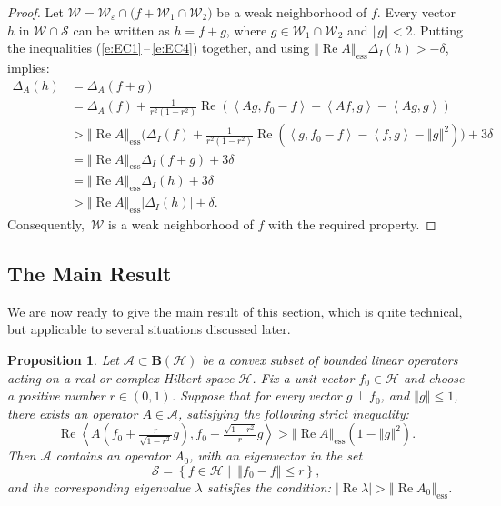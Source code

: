 \documentclass{tran-l}
\newtheorem{prop}[thm]{Proposition}
\theoremstyle{definition}
\theoremstyle{remark}
\numberwithin{equation}{subsection}
\DeclareMathOperator{\RE}{Re}
\DeclareMathOperator{\ess}{ess}
\newcommand{\eps}{\varepsilon}
\newcommand{\h}{\mathcal{H}}
\newcommand{\s}{\mathcal{S}}
\newcommand{\A}{\mathcal{A}}
\newcommand{\W}{\mathcal{W}}
\newcommand{\BH}{\mathbf{B}(\mathcal{H})}
\newcommand{\abs}[1]{\left\vert#1\right\vert}
\newcommand{\set}[1]{\left\{#1\right\}}
\newcommand{\seq}[1]{\left<#1\right>}
\newcommand{\norm}[1]{\left\Vert#1\right\Vert}
\newcommand{\essnorm}[1]{\norm{#1}_{\ess}}
\begin{document}
\begin{proof}
Let $\W = \W_\eps\cap\big(f + \W_1\cap\W_2\big)$ be a weak neighborhood of $f$. Every vector $h$ in $\W\cap\s$ can be written as $h=f+g$, where $g \in \W_1\cap\W_2$ and $\norm{g}<2$. Putting the inequalities (\ref{e:EC1}\,--\,\ref{e:EC4}) together, and using $\essnorm{\RE{A}}\Delta_I(h)>-\delta$, implies:
\begin{align*}
  \Delta_A(h) &= \Delta_A(f+g) \\ &=
  \Delta_A(f) + \tfrac{1}{r^2(1-r^2)}
  \RE( \seq{A g,f_0-f} - \seq{A f,g} - \seq{A g,g})\\ &>
  \essnorm{\RE{A}}\big( \Delta_I(f) +
    \tfrac{1}{r^2(1-r^2)}\RE (\seq{g,f_0-f} - \seq{f,g} -
    \norm{g}^2)\big) + 3\delta\\ &=
  \essnorm{\RE{A}} \Delta_I(f+g) + 3\delta\\ &=
  \essnorm{\RE{A}} \Delta_I(h) + 3\delta\\ &>
  \essnorm{\RE{A}} \abs{\Delta_I(h)} + \delta.
\end{align*}
Consequently,\, $\W$ is a weak neighborhood of $f$ with the required property.
\end{proof}

\subsection{The Main Result}
We are now ready to give the main result of this section, which is quite technical, but applicable to several situations discussed later.

\begin{prop} \label{p:ESS}
Let $\A\subset\BH$ be a convex subset of bounded linear operators acting on a real or complex Hilbert space $\h$. Fix a unit vector $f_0\in\h$ and choose a positive number $r\in(0,1)$. Suppose that for every vector $g\perp{f_0}$, and $\norm{g}\leq1$, there exists an operator $A\in\A$, satisfying the following strict inequality:
\begin{equation}\label{e:ESSCON}
  \RE\seq{A\left(f_0+\tfrac{r}{\sqrt{1-r^2}}g\right),
  f_0-\tfrac{\sqrt{1-r^2}}{r}g} > \essnorm{\RE{A}}(1 - \norm{g}^2).
\end{equation}
Then $\A$ contains an operator $A_0$, with an eigenvector in the set
\[ \s=\set{f\in\h\,\,|\,\,\,\norm{f_0-f}\leq{r}}, \]
and the corresponding eigenvalue $\lambda$ satisfies the condition: $\abs{\RE\lambda}>\essnorm{\RE{A_0}}$.
\end{prop}
\end{document}
